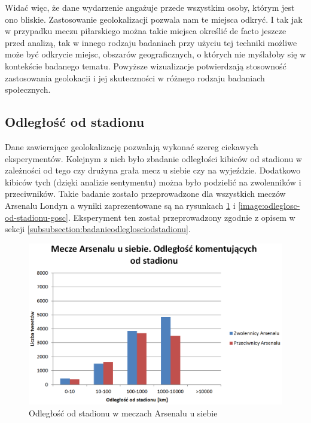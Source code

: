 Widać więc, że dane wydarzenie angażuje przede wszystkim osoby, którym jest ono
bliskie. Zastosowanie geolokalizacji pozwala nam te miejsca odkryć. I tak jak w
przypadku meczu piłarskiego można takie miejsca określić de facto jeszcze przed
analizą, tak w innego rodzaju badaniach przy użyciu tej techniki możliwe może
być odkrycie miejsc, obszarów geograficznych, o których nie myślałoby się w
kontekście badanego tematu. Powyższe wizualizacje potwierdzają stosowność
zastosowania geolokacji i jej skuteczności w różnego rodzaju badaniach
społecznych.

\subsection{Odległość od stadionu}
\label{subsection:odlegloscodstadionu}
Dane zawierające geolokalizację pozwalają wykonać szereg ciekawych eksperymentów.
Kolejnym z nich było zbadanie odległości kibiców od stadionu w zależności
od tego czy drużyna grała mecz u siebie czy na wyjeździe. Dodatkowo
kibiców tych (dzięki analizie sentymentu) można było podzielić na zwolenników
i przeciwników. Takie badanie zostało przeprowadzone dla wszystkich meczów
Arsenalu Londyn a wyniki zaprezentowane są na rysunkach 
\ref{image:odleglosc-od-stadionu-gospodarz} i \ref{image:odleglosc-od-stadionu-gosc}.
Eksperyment ten został przeprowadzony zgodnie z opisem w sekcji
\ref{subsubsection:badanieodleglosciodstadionu}.

\begin{figure}[ht!]
\centering
\includegraphics[width=140mm]{img/odleglosc-od-stadionu-home.PNG}
\caption{Odległość od stadionu w meczach Arsenalu u siebie}
\label{image:odleglosc-od-stadionu-gospodarz}
\end{figure}

